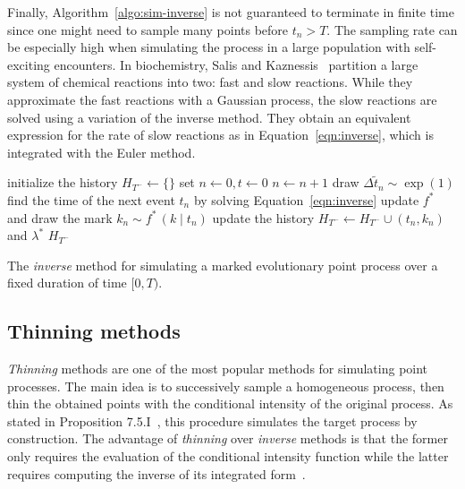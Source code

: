 \documentclass{juliacon}
\begin{document}
Finally, Algorithm~\ref{algo:sim-inverse} is not guaranteed to terminate in finite time since one might need to sample many points before \( t_n > T \). The sampling rate can be especially high when simulating the process in a large population with self-exciting encounters. In biochemistry, Salis and Kaznessis~\cite{salis2005} partition a large system of chemical reactions into two: fast and slow reactions. While they approximate the fast reactions with a Gaussian process, the slow reactions are solved using a variation of the inverse method. They obtain an equivalent expression for the rate of slow reactions as in Equation~\ref{eqn:inverse}, which is integrated with the Euler method.

\begin{algorithm}[h]
\begin{algorithmic}[1]
  \Procedure{InverseMethod}{\( [0, T) \), \( \lambda^\ast \), \( f^\ast \),}
    \State initialize the history \( H_{T^-} \leftarrow \{ \} \)
    \State set \( n \leftarrow 0, t \leftarrow  0 \)
      \State \( n \leftarrow n + 1 \)
      \State draw \( \Delta \tilde{t}_n \sim \exp(1) \)
      \State find the time of the next event \( t_n \) by solving Equation~\ref{eqn:inverse}
      \State update \( f^\ast \) and draw the mark \( k_n \sim f^\ast \, (k \mid t_n) \)
      \State update the history \( H_{T^-} \leftarrow H_{T^-} \cup (t_n, k_n) \) and \( \lambda^\ast \)
    \EndWhile
    \State \Return \( H_{T^-} \)
  \EndProcedure
\end{algorithmic}
\caption{The \textit{inverse} method for simulating a marked evolutionary point process over a fixed duration of time \( [0, T) \).}
\label{algo:sim-inverse}
\end{algorithm}

\subsection{Thinning methods} \label{subsec:sim-thinning}

\textit{Thinning} methods are one of the most popular methods for simulating point processes. The main idea is to successively sample a homogeneous process, then thin the obtained points with the conditional intensity of the original process. As stated in Proposition 7.5.I~\cite{daley2003}, this procedure simulates the target process by construction. The advantage of \textit{thinning} over \textit{inverse} methods is that the former only requires the evaluation of the conditional intensity function while the latter requires computing the inverse of its integrated form~\cite{daley2003}.
\end{document}
